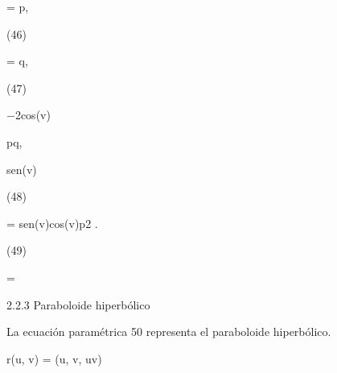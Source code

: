 \documentclass[a4paper,portrait,12pt]{article}
\begin{document}
\begin{flushleft}
= p,
\end{flushleft}





(46)





\begin{flushleft}
= q,
\end{flushleft}





(47)





\begin{flushleft}
$-$2cos(v)
\end{flushleft}


\begin{flushleft}
pq,
\end{flushleft}


\begin{flushleft}
sen(v)
\end{flushleft}





(48)





\begin{flushleft}
= sen(v)cos(v)p2 .
\end{flushleft}





(49)





=





\begin{flushleft}
2.2.3 Paraboloide hiperbólico
\end{flushleft}


\begin{flushleft}
La ecuación paramétrica 50 representa el paraboloide hiperbólico.
\end{flushleft}


\begin{flushleft}
r(u, v) = (u, v, uv)
\end{flushleft}
\end{document}
